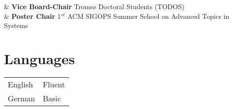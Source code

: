 \documentclass[11pt, a4paper]{article}
\newcommand{\TablePad}{\vspace{-0.4cm}}
\newcommand{\Year}[1]{\fontsize{10pt}{0}\selectfont #1}
\begin{document}
\begin{EntriesTable}
    \Year{2018} & \textbf{Vice Board-Chair} Troms{\o} Doctoral Students (TODOS)
    \\
    \Year{2018} & \textbf{Poster Chair} 1$^{st}$ ACM SIGOPS Summer School on Advanced Topics in Systems
\end{EntriesTable}


\iffalse

\subsection*{Reviewer}

Geophysical Journal International
--
Journal of Geodesy
--
Pure and Applied Geophysics
--
Journal of Applied Geophysics
--
Geophysical Prospecting
--
Geophysics
--
Central European Journal of Geosciences
--
Computers \& Geosciences

\fi
\iffalse

\subsection*{Affiliations}

American Geophysical Union
--
Society of Exploration Geophysicists
--
Geological Society of America

\fi

\section*{Languages}

\TablePad
\begin{tabularx}{\textwidth}{@{}p{} p{}@{}}
    English & Fluent %
    \\
    German & Basic %
\end{tabularx}
\end{document}
